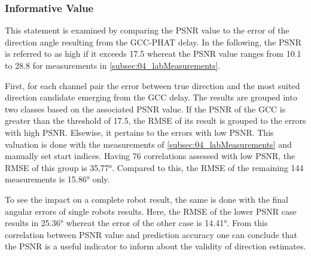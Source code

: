 \subsubsection*{Informative Value}

This statement is examined by comparing the \ac{PSNR} value
to the error of the direction angle resulting from the \ac{GCC-PHAT} delay.
In the following, the \ac{PSNR} is referred to as high if it exceeds 17.5
whereat the \ac{PSNR} value ranges from 10.1 to 28.8 for measurements in
\cref{subsec:04_labMeasurements}.

First, for each channel pair the error between true direction and the most
suited direction candidate
emerging from the \ac{GCC} delay.
The results are grouped into two classes based on the associated \ac{PSNR} value.
If the \ac{PSNR} of the \ac{GCC} is greater than the threshold of 17.5,
the \ac{RMSE} of its result is grouped to the errors with high \ac{PSNR}.
Elsewise, it pertains to the errors with low \ac{PSNR}.
This valuation is done with the measurements of \cref{subsec:04_labMeasurements}
and manually set start indices.
Having 76 correlations assessed with low \ac{PSNR}, the \ac{RMSE} of this group
is 35,77\si{\degree}.
Compared to this, the \ac{RMSE} of the remaining 144 measurements
is 15.86\si{\degree} only.

To see the impact on a complete robot result, the same is done
with the final angular errors of single robots results.
Here, the \ac{RMSE} of the lower \ac{PSNR} case results in 25.36\si{\degree}
whereat the error of the other case is 14.41\si{\degree}.
From this correlation between PSNR value and prediction accuracy one can
conclude that the PSNR is a useful indicator to inform about the validity of
direction estimates.

